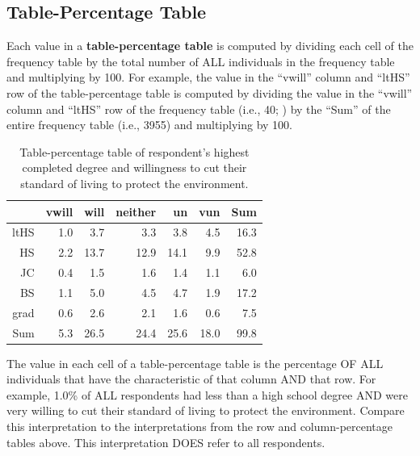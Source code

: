 \documentclass[10pt,openany]{book}\usepackage[]{graphicx}\usepackage[]{color}
\begin{document}

\vspace{-12pt}

\vspace{-12pt}
\subsection{Table-Percentage Table}
\vspace{-12pt}
Each value in a \textbf{table-percentage table} is computed by dividing each cell of the frequency table by the total number of ALL individuals in the frequency table and multiplying by 100.  For example, the value in the ``vwill'' column and ``ltHS'' row of the table-percentage table  is computed by dividing the value in the ``vwill'' column and ``ltHS'' row of the frequency table (i.e., 40; ) by the ``Sum'' of the entire frequency table (i.e., 3955) and multiplying by 100.

\begin{table}[ht]
\centering
\caption{Table-percentage table of respondent's highest completed degree and willingness to cut their standard of living to protect the environment.} 
\label{tab:EnvTblP}
\begin{tabular}{rrrrrrr}
  \hline
 & vwill & will & neither & un & vun & Sum \\ 
  \hline
ltHS & 1.0 & 3.7 & 3.3 & 3.8 & 4.5 & 16.3 \\ 
  HS & 2.2 & 13.7 & 12.9 & 14.1 & 9.9 & 52.8 \\ 
  JC & 0.4 & 1.5 & 1.6 & 1.4 & 1.1 & 6.0 \\ 
  BS & 1.1 & 5.0 & 4.5 & 4.7 & 1.9 & 17.2 \\ 
  grad & 0.6 & 2.6 & 2.1 & 1.6 & 0.6 & 7.5 \\ 
  Sum & 5.3 & 26.5 & 24.4 & 25.6 & 18.0 & 99.8 \\ 
   \hline
\end{tabular}
\end{table}


The value in each cell of a table-percentage table is the percentage OF ALL individuals that have the characteristic of that column AND that row.  For example, 1.0\% of ALL respondents had less than a high school degree AND were very willing to cut their standard of living to protect the environment.  Compare this interpretation to the interpretations from the row and column-percentage tables above.  This interpretation DOES refer to all respondents.
\end{document}
